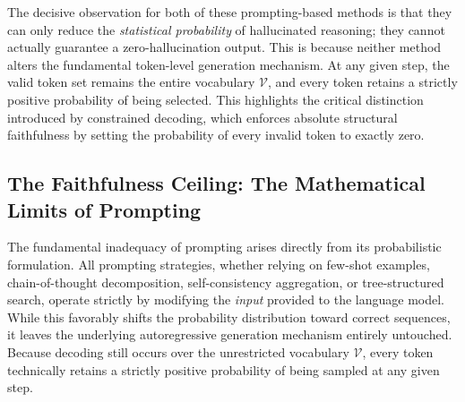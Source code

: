 The decisive observation for both of these prompting-based methods is that they can only reduce the \textit{statistical probability} of hallucinated reasoning; they cannot actually guarantee a zero-hallucination output. This is because neither method alters the fundamental token-level generation mechanism. At any given step, the valid token set remains the entire vocabulary $\mathcal{V}$, and every token retains a strictly positive probability of being selected. This highlights the critical distinction introduced by constrained decoding, which enforces absolute structural faithfulness by setting the probability of every invalid token to exactly zero.

\begin{table}[H]
    \centering
    \caption{Comparison of chain-of-thought family methods and KG-constrained
        decoding.}
    \label{tab:cot_vs_constrained}
\end{table}

\subsection{The Faithfulness Ceiling: The Mathematical Limits of Prompting}

The fundamental inadequacy of prompting arises directly from its probabilistic formulation. All prompting strategies, whether relying on few-shot examples, chain-of-thought decomposition, self-consistency aggregation, or tree-structured search, operate strictly by modifying the \textit{input} provided to the language model. While this favorably shifts the probability distribution toward correct sequences, it leaves the underlying autoregressive generation mechanism entirely untouched. Because decoding still occurs over the unrestricted vocabulary $\mathcal{V}$, every token technically retains a strictly positive probability of being sampled at any given step.

